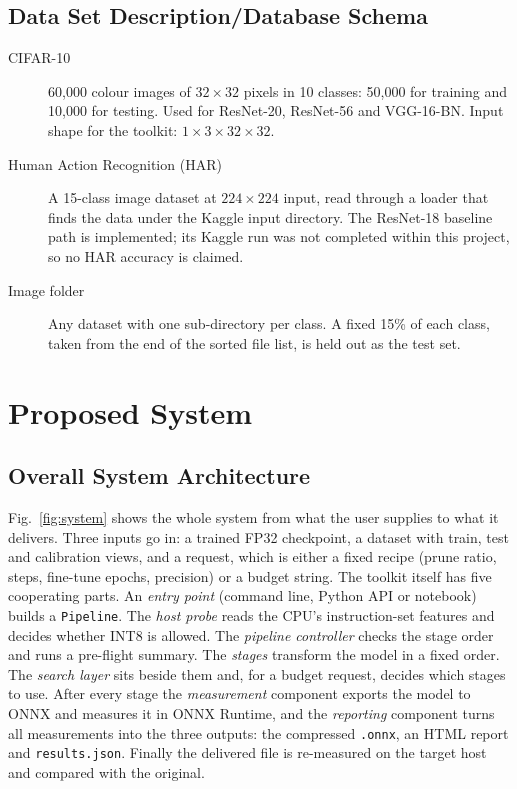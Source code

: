 \documentclass[oneside,a4paper,12pt]{report}
\newcommand{\code}[1]{\texttt{\small #1}}
\begin{document}
\section{Data Set Description/Database Schema }
\begin{description}
\item[CIFAR-10~\cite{krizhevsky2009}] 60,000 colour images of $32\times32$ pixels in 10 classes: 50,000 for training and 10,000 for testing. Used for ResNet-20, ResNet-56 and VGG-16-BN. Input shape for the toolkit: $1\times3\times32\times32$.
\item[Human Action Recognition (HAR)] A 15-class image dataset at $224\times224$ input, read through a loader that finds the data under the Kaggle input directory. The ResNet-18 baseline path is implemented; its Kaggle run was not completed within this project, so no HAR accuracy is claimed.
\item[Image folder] Any dataset with one sub-directory per class. A fixed 15\% of each class, taken from the end of the sorted file list, is held out as the test set.
\end{description}

\chapter{Proposed System}
\section{Overall System Architecture}
Fig.~\ref{fig:system} shows the whole system from what the user supplies to what it delivers. Three inputs go in: a trained FP32 checkpoint, a dataset with train, test and calibration views, and a request, which is either a fixed recipe (prune ratio, steps, fine-tune epochs, precision) or a budget string. The toolkit itself has five cooperating parts. An \emph{entry point} (command line, Python API or notebook) builds a \code{Pipeline}. The \emph{host probe} reads the CPU's instruction-set features and decides whether INT8 is allowed. The \emph{pipeline controller} checks the stage order and runs a pre-flight summary. The \emph{stages} transform the model in a fixed order. The \emph{search layer} sits beside them and, for a budget request, decides which stages to use. After every stage the \emph{measurement} component exports the model to ONNX and measures it in ONNX Runtime, and the \emph{reporting} component turns all measurements into the three outputs: the compressed \code{.onnx}, an HTML report and \code{results.json}. Finally the delivered file is re-measured on the target host and compared with the original.
\end{document}

